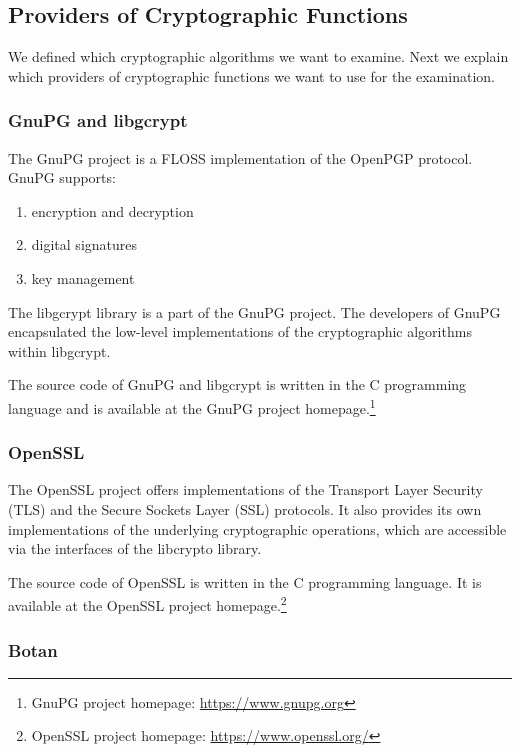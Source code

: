 \subsection{Providers of Cryptographic Functions}
\label{intro-provider}

We defined which cryptographic algorithms we want to examine.
Next we explain which providers of cryptographic functions we want to use for the examination.

  \subsubsection{GnuPG and libgcrypt}

The GnuPG project is a FLOSS implementation of the OpenPGP protocol.
GnuPG supports:\cite{gnupg-doc}
\begin{enumerate}
\item encryption and decryption
\item digital signatures
\item key management
\end{enumerate}

The libgcrypt library is a part of the GnuPG project.
The developers of GnuPG encapsulated the low-level implementations of the cryptographic algorithms within libgcrypt.

The source code of GnuPG and libgcrypt is written in the C programming language and is available at the GnuPG project homepage.\footnote{GnuPG project homepage: \url{https://www.gnupg.org}}

  \subsubsection{OpenSSL}

The OpenSSL project offers implementations of the Transport Layer Security (TLS) and the Secure Sockets Layer (SSL) protocols.
It also provides its own implementations of the underlying cryptographic operations, which are accessible via the interfaces of the libcrypto library.

The source code of OpenSSL is written in the C programming language.
It is available at the OpenSSL project homepage.\footnote{OpenSSL project homepage: \url{https://www.openssl.org/}}

  \subsubsection{Botan}

